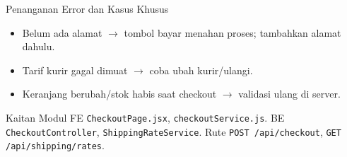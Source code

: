 \begin{flowsection}{Penanganan Error dan Kasus Khusus}
\begin{itemize}
  \item Belum ada alamat $\rightarrow$ tombol bayar menahan proses; tambahkan alamat dahulu.
  \item Tarif kurir gagal dimuat $\rightarrow$ coba ubah kurir/ulangi.
  \item Keranjang berubah/stok habis saat checkout $\rightarrow$ validasi ulang di server.
\end{itemize}
\end{flowsection}

\begin{flowsection}{Kaitan Modul}
FE \texttt{CheckoutPage.jsx}, \texttt{checkoutService.js}. BE
\texttt{CheckoutController}, \texttt{ShippingRateService}. Rute
\texttt{POST /api/checkout}, \texttt{GET /api/shipping/rates}.
\end{flowsection}

